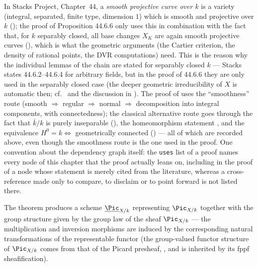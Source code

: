 \begin{remark}
\label{rem:pc-conventions}
In Stacks Project, Chapter~44, a \emph{smooth projective curve over $k$}
is a variety (integral, separated, finite type, dimension $1$) which is
smooth and projective over $k$
(); the proof of Proposition
44.6.6 only uses this in combination with the fact that, for $k$
separably closed, all base changes $X_K$ are again smooth projective
curves (), which is what the geometric
arguments (the Cartier criterion, the density of rational points, the
DVR computations) need.  This is the reason why the individual lemmas
of the chain are stated for separably closed $k$ — Stacks states
44.6.2--44.6.4 for arbitrary fields, but in the proof of 44.6.6 they
are only used in the separably closed case (the deeper geometric
irreducibility of $X$ is automatic then; cf.\ 
and the discussion in ).  The proof of
 uses the ``smoothness'' route
(smooth $\Rightarrow$ regular $\Rightarrow$ normal $\Rightarrow$
decomposition into integral components, with connectedness); the
classical alternative route goes through the fact that $\bar k/k$ is
purely inseparable (), the homeomorphism
statement , and the equivalence
$H^0=k\Leftrightarrow$ geometrically connected
() — all of which are recorded above,
even though the smoothness route is the one used in the proof.
One convention about the dependency graph itself: the \texttt{uses} list
of a proof names every node of this chapter that the proof actually leans
on, including in the proof of a node whose statement is merely cited from
the literature, whereas a cross-reference made only to compare, to
disclaim or to point forward is not listed there.
\end{remark}

\begin{remark}
\label{rem:pc-group-structure}
The theorem produces a scheme $\underline{\Pic}_{X/k}$ representing
$\Pic_{X/k}$ together with the group structure given by the group law of
the sheaf $\Pic_{X/k}$ — the multiplication and inversion morphisms are
induced by the corresponding natural transformations of the representable
functor (the group-valued functor structure of $\Pic_{X/k}$ comes
from that of the Picard presheaf, , and is
inherited by its fppf sheafification).
\end{remark}
